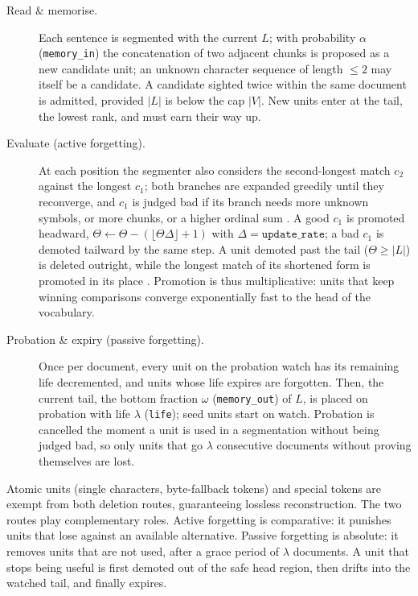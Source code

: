 \documentclass[pdflatex,sn-apa]{sn-jnl}
\begin{document}
\begin{description}
  \item[Read \& memorise.] Each sentence is segmented with the current $L$;
    with probability $\alpha$ (\texttt{memory\_in}) the concatenation of two
    adjacent chunks is proposed as a new candidate unit; an unknown character
    sequence of length ${\le}2$ may itself be a candidate. A candidate
    sighted twice within the same document is admitted, provided
    $|L|$ is below the cap $|V|$. New units enter at the tail, the lowest
    rank, and must earn their way up.
  \item[Evaluate (active forgetting).] At each position the segmenter also
    considers the second-longest match $c_2$ against the longest $c_1$; both
    branches are expanded greedily until they reconverge, and $c_1$ is
    judged bad if its branch needs more unknown symbols, or 
    more chunks, or 
    a higher ordinal sum
    \citep[\S 2.3.1]{yang2020less}. A good $c_1$ is promoted headward,
    $\Theta\leftarrow\Theta-(\lfloor\Theta\Delta\rfloor+1)$ with
    $\Delta=\texttt{update\_rate}$; a bad $c_1$ is demoted tailward by the
    same step. A unit demoted past the tail ($\Theta\ge|L|$) is
    deleted outright, while the longest match of its shortened form is
    promoted in its place \citep[\S 2.3.2]{yang2020less}. Promotion is thus
    multiplicative: units that keep winning comparisons converge
    exponentially fast to the head of the vocabulary. %
  \item[Probation \& expiry (passive forgetting).] Once per document, every
    unit on the probation watch has its remaining life decremented, and units
    whose life expires are forgotten. Then, the current tail, the bottom
    fraction $\omega$ (\texttt{memory\_out}) of $L$, is placed on probation with
    life $\lambda$ (\texttt{life}); seed units start on watch. Probation is
    cancelled the moment a unit is used in a segmentation without being judged
    bad, so
    only units that go $\lambda$ consecutive documents without proving
    themselves are lost.
\end{description}

Atomic units (single characters, byte-fallback tokens) and special tokens are
exempt from both deletion routes, guaranteeing lossless reconstruction.
The two routes play complementary roles. Active forgetting is
comparative: it punishes units that lose against an available alternative. Passive forgetting is absolute: it removes
units that are not used, after a grace period of $\lambda$
documents. A unit that stops being useful is first
demoted out of the safe head region, then drifts into the watched tail, and
finally expires.
\end{document}
